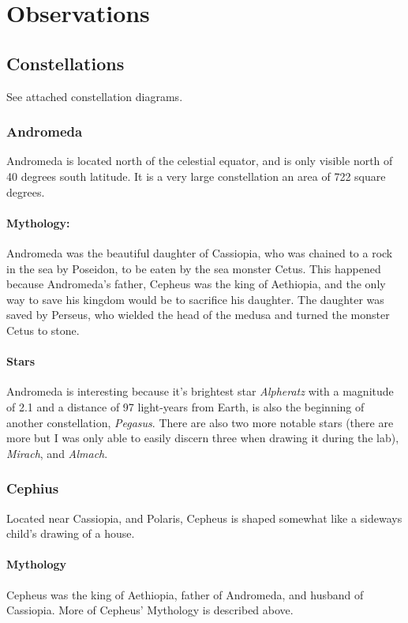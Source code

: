 \documentclass{article}
\begin{document}
\section{Observations}
\subsection{Constellations}
See attached constellation diagrams.

\subsubsection{Andromeda}
Andromeda is located north of the celestial equator, and is only visible north of 40 degrees south latitude. \cite{andromedastarmap} It is a very large constellation an area of 722 square degrees.
\paragraph{Mythology:}
Andromeda was the beautiful daughter of Cassiopia, who was chained to a rock in the sea by Poseidon, to be eaten by the sea monster Cetus.  This happened because Andromeda's father, Cepheus was the king of Aethiopia, and the only way to save his kingdom would be to sacrifice his daughter.  The daughter was saved by Perseus, who wielded the head of the medusa and turned the monster Cetus to stone.
\paragraph{Stars}
Andromeda is interesting because it's brightest star \emph{Alpheratz} with a magnitude of 2.1 and a distance of 97 light-years from Earth, is also the beginning of another constellation, \emph{Pegasus}.  There are also two more notable stars (there are more but I was only able to easily discern three when drawing it during the lab), \emph{Mirach}, and \emph{Almach}.

\subsubsection{Cephius}
Located near Cassiopia, and Polaris, Cepheus is shaped somewhat like a sideways child's drawing of a house.
\paragraph{Mythology}
Cepheus was the king of Aethiopia, father of Andromeda, and husband of Cassiopia.  More of Cepheus' Mythology is described above.
\end{document}
